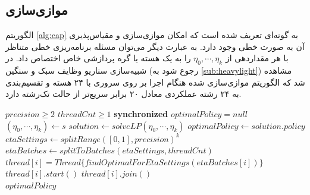 \subsection{موازی‌سازی}
الگوریتم \ref{alg:cap} به گونه‌ای تعریف شده است که امکان موازی‌سازی و مقیاس‌پذیری آن به صورت خطی وجود دارد. به عبارت دیگر می‌توان مسئله برنامه‌ریزی خطی متناظر با هر مقداردهی از
$\eta_0, \cdots, \eta_k$
را به یک هسته یا گره پردازشی خاص اختصاص داد. در شبیه‌سازی سناریو وظایف سبک و سنگین (رجوع شود به \ref{sub:heavylight}) مشاهده شد که الگوریتم موازی‌سازی شده هنگام اجرا بر روی سروری با ۲۴ هسته و تقسیم‌بندی به ۲۴ رشته عملکردی معادل ۲۰ برابر سریع‌تر از حالت تک‌رشته دارد.

\begin{latin}
	\begin{algorithm}
		\begin{algorithmic}[1]
			\Require $precision \geq 2$
			\Require $threadCnt \geq 1$
			\State \textbf{synchronized} $optimalPolicy = null$
			\State $(\eta_0, \cdots, \eta_k) \gets s$
			\State $solution \gets solveLP(\eta_0, \cdots, \eta_k)$
			\State $optimalPolicy \gets solution.policy$
			\EndIf
			\EndFor
			\EndProcedure
			\State $etaSettings \gets splitRange([0, 1], precision)^k$
			\State $etaBatches \gets splitToBatches(etaSettings, threadCnt)$
			\State \(thread[i] = Thread\{findOptimalForEtaSettings(etaBatches[i])\}\)
			\EndFor
			\State $thread[i].start()$
			\EndFor
			\State $thread[i].join()$
			\EndFor \\
			\Return $optimalPolicy$
		\end{algorithmic}
	\end{algorithm}
\end{latin}